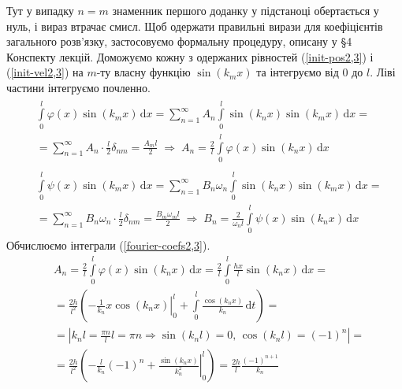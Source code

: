 Тут у випадку $n=m$  знаменник першого доданку у підстаноці обертається у нуль, і вираз втрачає смисл.  Щоб одержати правильні вирази для коефіцієнтів загального розв'язку, застосовуємо формальну процедуру, описану у §4 Конспекту лекцій. Доможуємо кожну з одержаних рівностей (\ref{init-pos2,3}) і (\ref{init-vel2,3}) на $m$-ту власну функцію $\sin(k_m x)$ та інтегруємо від $0$ до $l$. Ліві частини інтегруємо почленно. 
\begin{subequations} \label{fourier-coefs2,3}
    \begin{gather}
        \begin{aligned}
            &\int\limits_0^l \varphi(x) \sin(k_m x) \,\mathrm{d}x = \sum^{\infty}_{n=1} A_n \int\limits_0^l \sin(k_n x) \sin(k_m x) \,\mathrm{d}x =\\
            &= \sum^{\infty}_{n=1} A_n \cdot \frac{l}{2} \delta_{nm} = \frac{A_m l}{2}
            \;\Rightarrow\;
            A_n = \frac{2}{l} \int\limits_0^l \varphi(x) \sin(k_n x) \,\mathrm{d}x 
        \end{aligned}\\
        \begin{aligned}
            &\int\limits_0^l \psi(x) \sin(k_m x) \,\mathrm{d}x = \sum^{\infty}_{n=1} B_n\omega_n \int\limits_0^l \sin(k_n x) \sin(k_m x) \,\mathrm{d}x =\\
            &= \sum^{\infty}_{n=1} B_n\omega_n \cdot \frac{l}{2} \delta_{nm} = \frac{B_m \omega_m l}{2}
            \;\Rightarrow\;
            B_n = \frac{2}{\omega_n l} \int\limits_0^l \psi(x) \sin(k_n x) \,\mathrm{d}x
        \end{aligned}
    \end{gather}
\end{subequations} 
Обчислюємо інтеграли (\ref{fourier-coefs2,3}).
\begin{equation*}
    \begin{aligned}
        &A_n = \frac{2}{l} \int\limits_0^l \varphi(x) \sin(k_n x) \,\mathrm{d}x = \frac{2}{l} \int\limits_0^l \frac{hx}{l} \sin(k_n x) \,\mathrm{d}x =\\
        &= \frac{2h}{l^2} \left(\left.-\frac{1}{k_n} x \cos(k_n x)\right|_0^l + \int\limits_0^l \frac{\cos(k_n x)}{k_n} \,\mathrm{d}t\right) =\\
        &= \left| k_n l = \frac{\pi n}{l} l = \pi n \Rightarrow \sin(k_n l) = 0,\, \cos(k_n l) = (-1)^n \right| =\\
        &= \frac{2h}{l^2} \left(-\frac{l}{k_n}(-1)^n + \left.\frac{\sin(k_n x)}{k_n^2}\right|_0^l \right) = \frac{2h}{l} \frac{(-1)^{n+1}}{k_n}
    \end{aligned}
\end{equation*}
